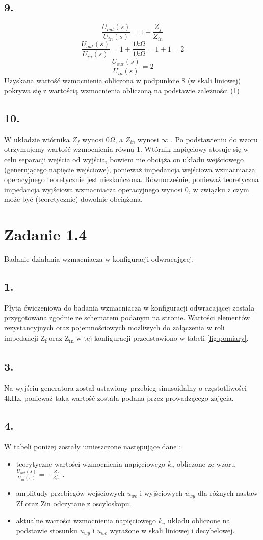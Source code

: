 \documentclass[polish,a4paper]{article}
\begin{document}
\subsection*{9.}
\begin{equation}
\frac{U_{out}(s)}{U_{in}(s)} = 1 + \frac{Z_{f}}{Z_{in}}
\end{equation}
$$\frac{U_{out}(s)}{U_{in}(s)} = 1 + \frac{1k\Omega}{1k\Omega} = 1+1=2$$
$$\frac{U_{out}(s)}{U_{in}(s)} = 2$$
Uzyskana wartość wzmocnienia obliczona w podpunkcie 8 (w skali liniowej) pokrywa się z wartością wzmocnienia obliczoną na podstawie zależności (1)\cite{rlc}
\subsection*{10.}
W układzie wtórnika $Z_f$ wynosi $0\Omega$, a $Z_{in}$ wynosi $\infty$ . Po podstawieniu do wzoru otrzymujemy wartość wzmocnienia równą 1. Wtórnik napięciowy stosuje się w celu separacji wejścia od wyjścia, bowiem nie obciąża on układu wejściowego (generującego napięcie wejściowe), ponieważ impedancja wejściowa wzmacniacza operacyjnego teoretycznie jest nieskończona. Równocześnie, ponieważ teoretyczna impedancja wyjściowa wzmacniacza operacyjnego wynosi 0, w związku z czym może być (teoretycznie) dowolnie obciążona.

\section{Zadanie 1.4}
Badanie działania wzmacniacza w konfiguracji odwracającej. 
\subsection*{1.}
Płyta ćwiczeniowa do badania wzmacniacza w konfiguracji odwracającej została przygotowana zgodnie ze schematem podanym na stronie\cite{rlc}.  Wartości elementów rezystancyjnych oraz pojemnościowych  możliwych do załączenia w roli impedancji Z\textsubscript{f} oraz Z\textsubscript{in} w tej konfiguracji przedstawiono w tabeli \ref{fig:pomiary}.
\subsection*{3.}
Na wyjściu generatora został ustawiony przebieg sinusoidalny o częstotliwości 4kHz, ponieważ taka wartość została podana przez prowadzącego zajęcia.
\subsection*{4.}
W tabeli poniżej zostały umieszczone następujące dane : 
\begin{itemize}
\item teorytyczne wartości wzmocnienia napięciowego $k_u$ obliczone ze wzoru $\frac{U_{out}(s)}{U_{in}(s)} = - \frac{Z_{f}}{Z_{in}}$ \cite{rlc}.
\item amplitudy przebiegów wejściowych $u_{we}$ i wyjściowych $u_{wy}$ dla różnych nastaw Zf oraz Zin odczytane z oscyloskopu.
\item  aktualne wartości wzmocnienia napięciowego $k_u$ układu obliczone na podstawie stosunku $u_{wy}$ i $u_{we}$ wyrażone w skali liniowej i decybelowej.
\end{itemize}
\end{document}
